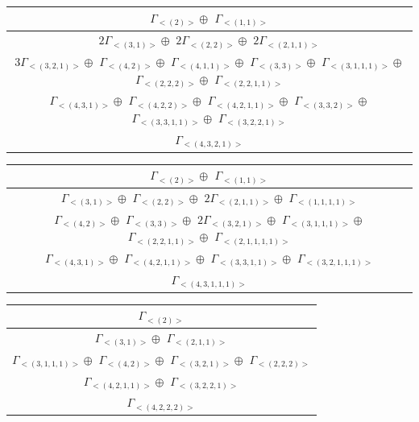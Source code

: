 \begin{minipage}{1\textwidth}
\centering
\begin{tabular}{|c|}\hline
$\Gamma_{<(
2
)>} \oplus$
$\Gamma_{<(
1 , 
1
)>}$
\\ \hline
$ 2 \Gamma_{<(
3 , 
1
)>} \oplus$
$ 2 \Gamma_{<(
2 , 
2
)>} \oplus$
$ 2 \Gamma_{<(
2 , 
1 , 
1
)>}$
\\ \hline
$ 3 \Gamma_{<(
3 , 
2 , 
1
)>} \oplus$
$\Gamma_{<(
4 , 
2
)>} \oplus$
$\Gamma_{<(
4 , 
1 , 
1
)>} \oplus$
$\Gamma_{<(
3 , 
3
)>} \oplus$
$\Gamma_{<(
3 , 
1 , 
1 , 
1
)>} \oplus$
$\Gamma_{<(
2 , 
2 , 
2
)>} \oplus$
$\Gamma_{<(
2 , 
2 , 
1 , 
1
)>}$
\\ \hline
$\Gamma_{<(
4 , 
3 , 
1
)>} \oplus$
$\Gamma_{<(
4 , 
2 , 
2
)>} \oplus$
$\Gamma_{<(
4 , 
2 , 
1 , 
1
)>} \oplus$
$\Gamma_{<(
3 , 
3 , 
2
)>} \oplus$
$\Gamma_{<(
3 , 
3 , 
1 , 
1
)>} \oplus$
$\Gamma_{<(
3 , 
2 , 
2 , 
1
)>}$
\\ \hline
$\Gamma_{<(
4 , 
3 , 
2 , 
1
)>}$
\\
\hline\end{tabular}\end{minipage}
\bigskip
\begin{minipage}{1\textwidth}
\centering
\begin{tabular}{|c|}\hline
$\Gamma_{<(
2
)>} \oplus$
$\Gamma_{<(
1 , 
1
)>}$
\\ \hline
$\Gamma_{<(
3 , 
1
)>} \oplus$
$\Gamma_{<(
2 , 
2
)>} \oplus$
$ 2 \Gamma_{<(
2 , 
1 , 
1
)>} \oplus$
$\Gamma_{<(
1 , 
1 , 
1 , 
1
)>}$
\\ \hline
$\Gamma_{<(
4 , 
2
)>} \oplus$
$\Gamma_{<(
3 , 
3
)>} \oplus$
$ 2 \Gamma_{<(
3 , 
2 , 
1
)>} \oplus$
$\Gamma_{<(
3 , 
1 , 
1 , 
1
)>} \oplus$
$\Gamma_{<(
2 , 
2 , 
1 , 
1
)>} \oplus$
$\Gamma_{<(
2 , 
1 , 
1 , 
1 , 
1
)>}$
\\ \hline
$\Gamma_{<(
4 , 
3 , 
1
)>} \oplus$
$\Gamma_{<(
4 , 
2 , 
1 , 
1
)>} \oplus$
$\Gamma_{<(
3 , 
3 , 
1 , 
1
)>} \oplus$
$\Gamma_{<(
3 , 
2 , 
1 , 
1 , 
1
)>}$
\\ \hline
$\Gamma_{<(
4 , 
3 , 
1 , 
1 , 
1
)>}$
\\
\hline\end{tabular}\end{minipage}
\bigskip
\begin{minipage}{1\textwidth}
\centering
\begin{tabular}{|c|}\hline
$\Gamma_{<(
2
)>}$
\\ \hline
$\Gamma_{<(
3 , 
1
)>} \oplus$
$\Gamma_{<(
2 , 
1 , 
1
)>}$
\\ \hline
$\Gamma_{<(
3 , 
1 , 
1 , 
1
)>} \oplus$
$\Gamma_{<(
4 , 
2
)>} \oplus$
$\Gamma_{<(
3 , 
2 , 
1
)>} \oplus$
$\Gamma_{<(
2 , 
2 , 
2
)>}$
\\ \hline
$\Gamma_{<(
4 , 
2 , 
1 , 
1
)>} \oplus$
$\Gamma_{<(
3 , 
2 , 
2 , 
1
)>}$
\\ \hline
$\Gamma_{<(
4 , 
2 , 
2 , 
2
)>}$
\\
\hline\end{tabular}\end{minipage}
